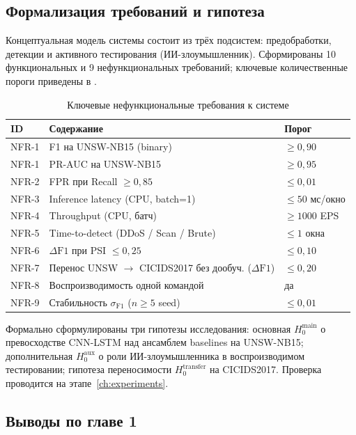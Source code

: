 \subsection{Формализация требований и гипотеза}

Концептуальная модель системы состоит из трёх подсистем:
предобработки, детекции и активного тестирования
(ИИ-злоумышленник). Сформированы 10 функциональных и 9 нефункциональных
требований; ключевые количественные пороги приведены в
.

\begin{table}[H]
\centering
\caption{Ключевые нефункциональные требования к системе}
\label{tab:requirements}
\renewcommand{\arraystretch}{1.2}
\begin{tabularx}{\linewidth}{@{}lXl@{}}
\toprule
\textbf{ID} & \textbf{Содержание} & \textbf{Порог} \\
\midrule
NFR-1 & F1 на UNSW-NB15 (binary) & $\geq 0{,}90$ \\
NFR-1 & PR-AUC на UNSW-NB15      & $\geq 0{,}95$ \\
NFR-2 & FPR при Recall $\geq 0{,}85$ & $\leq 0{,}01$ \\
NFR-3 & Inference latency (CPU, batch=1) & $\leq 50$ мс/окно \\
NFR-4 & Throughput (CPU, батч)           & $\geq 1000$ EPS \\
NFR-5 & Time-to-detect (DDoS / Scan / Brute) & $\leq 1$ окна \\
NFR-6 & $\Delta\text{F1}$ при PSI $\leq 0{,}25$ & $\leq 0{,}10$ \\
NFR-7 & Перенос UNSW $\to$ CICIDS2017 без дообуч. ($\Delta\text{F1}$) & $\leq 0{,}20$ \\
NFR-8 & Воспроизводимость одной командой & да \\
NFR-9 & Стабильность $\sigma_{\text{F1}}$ (\(n \geq 5\) seed) & $\leq 0{,}01$ \\
\bottomrule
\end{tabularx}
\end{table}

Формально сформулированы три гипотезы исследования:
основная \(H_0^{\text{main}}\) о превосходстве CNN-LSTM над ансамблем
baselines на UNSW-NB15; дополнительная \(H_0^{\text{aux}}\) о роли
ИИ-злоумышленника в воспроизводимом тестировании; гипотеза
переносимости \(H_0^{\text{transfer}}\) на CICIDS2017. Проверка
проводится на этапе~\ref{ch:experiments}.

\subsection*{Выводы по главе 1}

